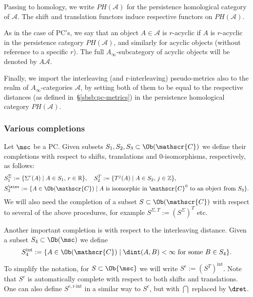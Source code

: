 Passing to homology, we write $PH(\mathcal{A})$ for the persistence
homological category of $\mathcal{A}$. The shift and translation
functors induce respective functors on $PH(\mathcal{A})$.

As in the case of PC's, we say that an object $A \in \mathcal{A}$ is
$r$-acyclic if $A$ is $r$-acyclic in the persistence category
$PH(\mathcal{A})$, and similarly for acyclic objects (without
reference to a specific $r$). The full $A_{\infty}$-subcategory of
acyclic objects will be denoted by $A\mathcal{A}$.

Finally, we import the interleaving (and r-interleaving)
  pseudo-metrics also to the realm of $A_{\infty}$-categories
$\mathcal{A}$, by setting both of them to be equal to the respective
distances (as defined in~\S\ref{sbsb:pc-metrics}) in the persistence
homological category $PH(\mathcal{A})$.


\subsubsection{Various completions} \label{sbsb:comp} Let $\msc$ be a
PC. Given subsets $S_1, S_2, S_3 \subset \Ob(\mathscr{C})$ we define
their completions with respect to shifts, translations and
$0$-isomorphisms, respectively, as follows:
\begin{equation}
  \begin{aligned}
    & S_1^{\Sigma} := \{ \Sigma^r(A) \mid A \in S_1, \, r \in
    \mathbb{R}\}, \quad
    S_2^{T} := \{T^j(A) \mid A \in S_2, \, j \in \mathbb{Z}\}, \\
    & S_3^{\ziso} := \{ A \in \Ob(\mathscr{C}) \mid A \text{ is
      isomorphic in } \mathscr{C}^0 \text{ to an object from } S_3\}.
  \end{aligned}
\end{equation}
We will also need the completion of a subset
$S \subset \Ob(\mathscr{C})$ with respect to several of the above
procedures, for example $S^{\Sigma, T} := (S^{\Sigma})^T$ etc.

Another important completion is with respect to the interleaving
distance. Given a subset $S_4 \subset \Ob(\msc)$ we define
$$S_4^{\text{int}} :=
\{ A \in \Ob(\mathscr{C}) \mid \dint(A, B) < \infty \text{ for some }
B \in S_4\}.$$ To simplify the notation, for $S \subset \Ob{\msc}$ we
will write $S^{c} := (S^{T})^{\text{int}}$.
Note that $S^c$ is automatically complete with respect to both shifts
and translations.
One can also define $S^{c,\text{r-int}}$ in a similar way to $S^c$,
but with $\dint$ replaced by $\dret$.

